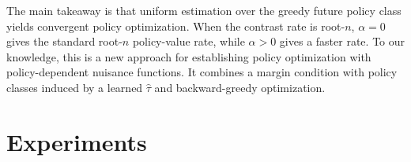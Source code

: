 \documentclass[opre,nonblindrev]{informs4}
\begin{document}
The main takeaway is that uniform estimation over the greedy future
policy class yields convergent policy optimization. When the contrast rate is
root-$n$, $\alpha=0$ gives the standard root-$n$ policy-value rate, while
$\alpha>0$ gives a faster rate. To our knowledge, this is a new approach for
establishing policy optimization with policy-dependent nuisance functions. It
combines a margin condition with policy classes induced by a learned
$\hat\tau$ and backward-greedy optimization.

\section{Experiments}\label{sec-experiments}
\end{document}
